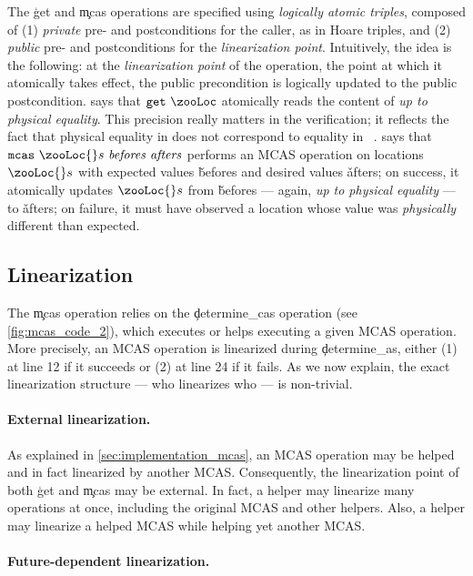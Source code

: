 The \c{get} and \c{mcas} operations are specified using \emph{logically atomic triples}, composed of (1) \emph{private} pre- and postconditions for the caller, as in Hoare triples, and (2) \emph{public} pre- and postconditions for the \emph{linearization point}.
Intuitively, the idea is the following: at the \emph{linearization point} of the operation, \ie the point at which it atomically takes effect, the public precondition is logically updated to the public postcondition.
 says that $\c{get}\ \zooLoc$ atomically reads the content of \zooLoc \emph{up to physical equality}.
This precision really matters in the verification; it reflects the fact that physical equality in \OCaml does not correspond to equality in \Rocq~\citep{DBLP:journals/pacmpl/AllainS26}.
 says that $\c{mcas}\ \zooLoc{}s\ \v{befores}\ \v{afters}$ performs an MCAS operation on locations $\zooLoc{}s$ with expected values \v{befores} and desired values \v{afters}; on success, it atomically updates $\zooLoc{}s$ from \v{befores} --- again, \emph{up to physical equality} --- to \v{afters}; on failure, it must have observed a location whose value was \emph{physically} different than expected.

\subsection{Linearization}

The \c{mcas} operation relies on the \c{determine\_cas} operation (see \cref{fig:mcas_code_2}), which executes or helps executing a given MCAS operation.
More precisely, an MCAS operation is linearized during \c{determine\_as}, either (1) at line 12 if it succeeds or (2) at line 24 if it fails.
As we now explain, the exact linearization structure --- who linearizes who --- is non-trivial.

\paragraph{External linearization.}

As explained in \cref{sec:implementation_mcas}, an MCAS operation may be helped and in fact linearized by another MCAS.
Consequently, the linearization point of both \c{get} and \c{mcas} may be external.
In fact, a helper may linearize many operations at once, including the original MCAS and other helpers.
Also, a helper may linearize a helped MCAS while helping yet another MCAS.

\paragraph{Future-dependent linearization.}

